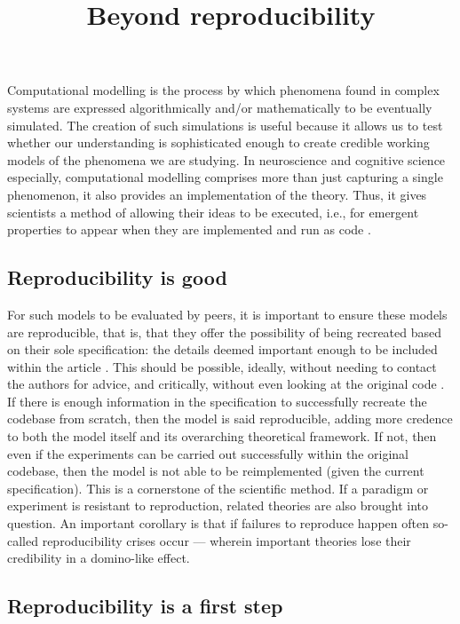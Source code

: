 \documentclass[jou]{apa6}
\title{Beyond reproducibility}
\begin{document}
\maketitle

Computational modelling is the process by which phenomena found in complex
systems are expressed algorithmically and/or mathematically to be eventually
simulated. The creation of such simulations is useful because it allows us to
test whether our understanding is sophisticated enough to create credible
working models of the phenomena we are studying. In neuroscience and cognitive
science especially, computational modelling comprises more than just capturing
a single phenomenon, it also provides an implementation of the theory. Thus, it
gives scientists a method of allowing their ideas to be executed, i.e., for
emergent properties to appear when they are implemented and run as code
\cite{mcclelland09}.

\subsection*{Reproducibility is good}

For such models to be evaluated by peers, it is important to ensure these
models are reproducible, that is, that they offer the possibility of being
recreated based on their sole specification: the details deemed important
enough to be included within the article \cite{hinsen15}. This should be
possible, ideally, without needing to contact the authors for advice, and
critically, without even looking at the original code \cite{cooper14}. If
there is enough information in the specification to successfully recreate
the codebase from scratch, then the model is said reproducible, adding
more credence to both the model itself and its overarching theoretical
framework. If not, then even if the experiments can be carried out successfully
within the original codebase, then the model is not able to be reimplemented
(given the current specification). This is a cornerstone of the scientific
method. If a paradigm or experiment is resistant to reproduction, related
theories are also brought into question. An important corollary is that if
failures to reproduce happen often so-called reproducibility crises occur —
wherein important theories lose their credibility in a domino-like effect.


\subsection*{Reproducibility is a first step}
\end{document}
